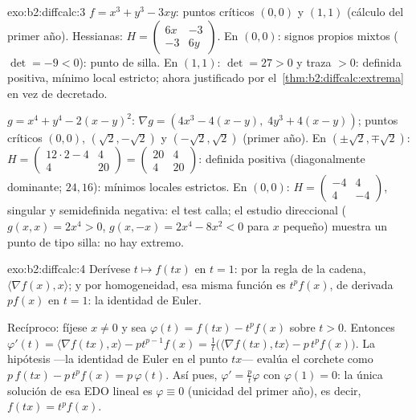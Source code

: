 \begin{solution}{exo:b2:diffcalc:3}
$f = x^3 + y^3 - 3xy$: puntos críticos $(0,0)$ y $(1,1)$ (cálculo del
primer año). Hessianas: $H = \begin{pmatrix} 6x & -3\\ -3 &
6y\end{pmatrix}$. En $(0,0)$: signos propios mixtos ($\det = -9 <
0$): punto de silla. En $(1,1)$: $\det = 27 > 0$ y traza $> 0$:
definida positiva, mínimo local estricto; ahora justificado por el~\cref{thm:b2:diffcalc:extrema} en vez de decretado.

$g = x^4 + y^4 - 2(x-y)^2$: $\nabla g = (4x^3 - 4(x - y),\; 4y^3 +
4(x-y))$; puntos críticos $(0,0)$, $(\sqrt2, -\sqrt2)$ y $(-\sqrt2,
\sqrt2)$ (primer año). En $(\pm\sqrt2, \mp\sqrt2)$: $H =
\begin{pmatrix} 12\cdot2 - 4 & 4\\ 4 & 20\end{pmatrix} =
\begin{pmatrix} 20 & 4\\ 4 & 20\end{pmatrix}$: definida positiva
(diagonalmente dominante;  $24, 16$): mínimos locales
estrictos. En $(0,0)$: $H = \begin{pmatrix} -4 & 4\\ 4 &
-4\end{pmatrix}$, singular y semidefinida negativa: el test calla; el
estudio direccional ($g(x,x) = 2x^4 > 0$, $g(x,-x) = 2x^4 - 8x^2 < 0$
para $x$ pequeño) muestra un punto de tipo silla: no hay extremo.
\end{solution}

\begin{solution}{exo:b2:diffcalc:4}
Derívese $t \mapsto f(tx)$ en $t = 1$: por la regla de la cadena,
$\langle \nabla f(x), x\rangle$; y por homogeneidad, esa misma
función es $t^pf(x)$, de derivada $pf(x)$ en $t = 1$: la identidad de
Euler.

Recíproco: fíjese $x \neq 0$ y sea $\varphi(t) = f(tx) - t^p f(x)$
sobre $t > 0$. Entonces $\varphi'(t) = \langle\nabla f(tx), x\rangle
- pt^{p-1}f(x) = \frac1t\bigl(\langle \nabla f(tx), tx\rangle -
p\,t^pf(x)\bigr)$. La hipótesis ---la identidad de Euler en el punto
$tx$--- evalúa el corchete como $p\,f(tx) - p\,t^pf(x) =
p\,\varphi(t)$. Así pues, $\varphi' = \frac{p}{t}\varphi$ con
$\varphi(1) = 0$: la única solución de esa EDO lineal es $\varphi
\equiv 0$ (unicidad del primer año), es decir, $f(tx) = t^pf(x)$.
\end{solution}

